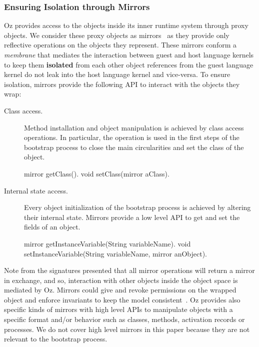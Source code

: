 \subsubsection{Ensuring Isolation through Mirrors}\label{sec:mirrors}

Oz provides access to the objects inside its inner runtime system through proxy objects. We consider these proxy objects as mirrors~\cite{Brac04b} as they provide only reflective operations on the objects they represent. These mirrors conform a \emph{membrane} that mediates the interaction between guest and host language kernels to keep them \textbf{isolated} from each other \ie object references from the guest language kernel do not leak into the host language kernel and vice-versa. To ensure isolation, mirrors provide the following API to interact with the objects they wrap:

\begin{description}
\item[Class access.] Method installation and object manipulation is achieved by class access operations. In particular, the  operation is used in the first steps of the bootstrap process to close the main circularities and set the class of the  object.
\begin{code}
mirror getClass().
void setClass(mirror aClass).
\end{code}

\item[Internal state access.] Every object initialization of the bootstrap process is achieved by altering their internal state. Mirrors provide a low level API to get and set the fields of an object.
\begin{code}
mirror getInstanceVariable(String variableName).
void setInstanceVariable(String variableName, mirror anObject).
\end{code}
\end{description}

Note from the signatures presented that all mirror operations will return a mirror in exchange, and so, interaction with other objects inside the object space is mediated by Oz. Mirrors could give and revoke permissions on the wrapped object and enforce invariants to keep the model consistent~\cite{Teru13a}.
Oz provides also specific kinds of mirrors with high level APIs to manipulate objects with a specific format and/or behavior such as classes, methods, activation records or processes. We do not cover high level mirrors in this paper because they are not relevant to the bootstrap process.


